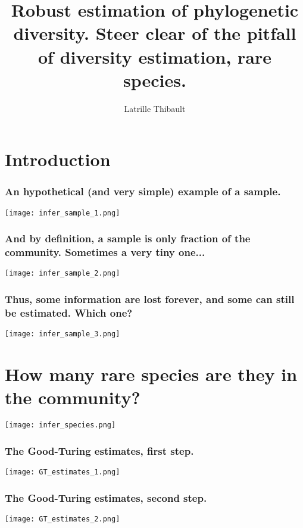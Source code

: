\documentclass[10pt]{beamer}
\author{Latrille Thibault}
\title{Robust estimation of phylogenetic diversity. Steer clear of the pitfall of diversity estimation, rare species.}
\begin{document}
\frame{\titlepage} 

\section{Introduction}

\begin{frame}
\frametitle{An hypothetical (and very simple) example of a sample.}
	\begin{center}
       \texttt{[image: infer\_sample\_1.png]}
	\end{center}
\end{frame}

\begin{frame}
\frametitle{And by definition, a sample is only fraction of the community. Sometimes a very tiny one...}
	\begin{center}
       \texttt{[image: infer\_sample\_2.png]}
	\end{center}
\end{frame}

\begin{frame}
\frametitle{Thus, some information are lost forever, and some can still be estimated. Which one?}
	\begin{center}
       \texttt{[image: infer\_sample\_3.png]}
	\end{center}
\end{frame}


\section{How many rare species are they in the community?}

\begin{frame}

	\begin{center}
       \texttt{[image: infer\_species.png]}
	\end{center}
	
\end{frame}


\begin{frame}
\frametitle{The Good-Turing estimates, first step.}
	\begin{center}
       \texttt{[image: GT\_estimates\_1.png]}
	\end{center}
\end{frame}

\begin{frame}
\frametitle{The Good-Turing estimates, second step.}
	\begin{center}
       \texttt{[image: GT\_estimates\_2.png]}
	\end{center}
\end{frame}
\end{document}
